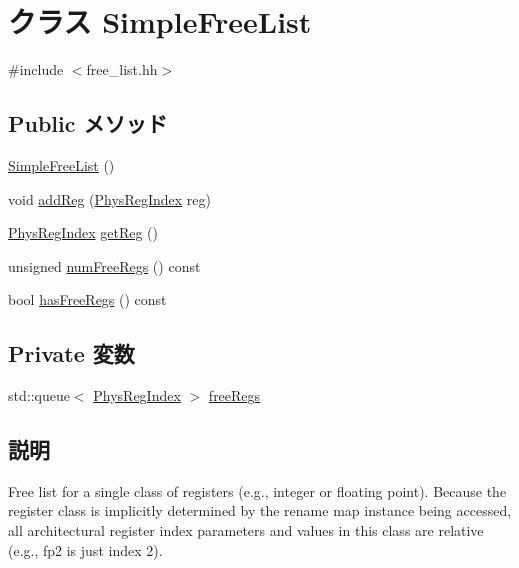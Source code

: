 \hypertarget{classSimpleFreeList}{
\section{クラス SimpleFreeList}
\label{classSimpleFreeList}
}


{\ttfamily \#include $<$free\_\-list.hh$>$}\subsection*{Public メソッド}
\begin{DoxyCompactItemize}
\item 
\hyperlink{classSimpleFreeList_ac0c17bdab6af2b589f25ae9e306ccbbf}{SimpleFreeList} ()
\item 
void \hyperlink{classSimpleFreeList_a51f4a8910619d8612bc91e35e7da04a1}{addReg} (\hyperlink{o3_2comm_8hh_a5ec29599c4bc29a3054c451674969e7b}{PhysRegIndex} reg)
\item 
\hyperlink{o3_2comm_8hh_a5ec29599c4bc29a3054c451674969e7b}{PhysRegIndex} \hyperlink{classSimpleFreeList_a63984297d0c1d9c27bbcd699d23afd53}{getReg} ()
\item 
unsigned \hyperlink{classSimpleFreeList_a95b70656efc827474c66168faefd0c4f}{numFreeRegs} () const 
\item 
bool \hyperlink{classSimpleFreeList_a8986100bc14f85e11279f599a34d0e78}{hasFreeRegs} () const 
\end{DoxyCompactItemize}
\subsection*{Private 変数}
\begin{DoxyCompactItemize}
\item 
std::queue$<$ \hyperlink{o3_2comm_8hh_a5ec29599c4bc29a3054c451674969e7b}{PhysRegIndex} $>$ \hyperlink{classSimpleFreeList_a0aa9568834013c42d01789a6cfea8305}{freeRegs}
\end{DoxyCompactItemize}


\subsection{説明}
Free list for a single class of registers (e.g., integer or floating point). Because the register class is implicitly determined by the rename map instance being accessed, all architectural register index parameters and values in this class are relative (e.g., fp2 is just index 2). 

